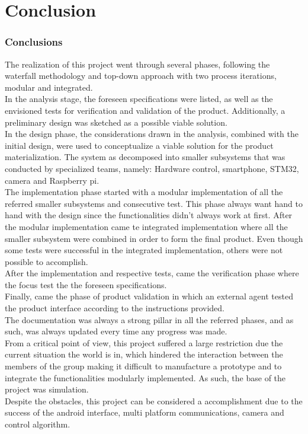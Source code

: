 \chapter{Conclusion}
\label{ch:conclusion}
\subsection{Conclusions}
The realization of this project went through several phases, following the waterfall methodology and top-down approach with two process iterations, modular and integrated.\\
In the analysis stage, the foreseen specifications were listed, as well as the envisioned tests for verification and validation of the product. Additionally, a preliminary design was sketched as a possible viable solution.\\
In the design phase, the considerations drawn in the analysis, combined with the initial design, were used to conceptualize a viable solution for the product materialization. The system as decomposed into smaller subsystems that was conducted by specialized teams, namely: Hardware control, smartphone, STM32, camera and Raspberry pi.\\
The implementation phase started with a modular implementation of all the referred smaller subsystems and consecutive test. This phase always want hand to hand with the design since the functionalities didn't always work at first. After the modular implementation came te integrated implementation where all the smaller subsystem were combined in order to form the final product. Even though some tests were successful in the integrated implementation, others were not possible to accomplish.\\
After the implementation and respective tests, came the verification phase where the focus test the the foreseen specifications.\\
Finally, came the phase of product validation in which an external agent tested the product interface according to the instructions provided.\\
The documentation was always a strong pillar in all the referred phases, and as such, was always updated every time any progress was made.\\
From a critical point of view, this project suffered a large restriction due the current situation the world is in, which hindered the interaction between the members of the group making it difficult to manufacture a prototype and to integrate the functionalities modularly implemented. As such, the base of the project was simulation.\\
Despite the obstacles, this project can be considered a accomplishment due to the success of the android interface, multi platform communications, camera and control algorithm.
\newpage
